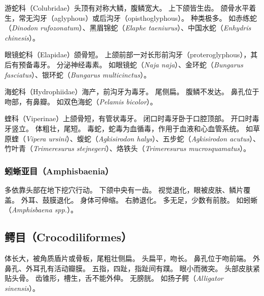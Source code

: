 \documentclass[11pt]{article}
\begin{document}
游蛇科（Colubridae）头顶有对称大鳞，腹鳞宽大。
上下颌皆生齿。
颌骨水平着生，常无沟牙（aglyphous）或后沟牙（opisthoglyphous）。
种类极多。
如赤练蛇（\textit{Dinodon rufozonatum}）、黑眉锦蛇（\textit{Elaphe taeniurus}）、中国水蛇（\textit{Enhydris chinesis}）。

\newline

眼镜蛇科（Elapidae）颌骨短。
上颌前部一对长形前沟牙（proteroglyphous），其后有预备毒牙。
分泌神经毒素。
如眼镜蛇（\textit{Naja naja}）、金环蛇（\textit{Bungarus fasciatus}）、银环蛇（\textit{Bungarus multicinctus}）。

\newline

海蛇科（Hydrophiidae）海产，前沟牙为毒牙。
尾侧扁。
腹鳞不发达。
鼻孔位于吻部，有鼻瓣。
如双色海蛇（\textit{Pelamis bicolor}）。

\newline

蝰科（Viperinae）上颌骨短，有管状毒牙。
闭口时毒牙卧于口腔顶部。
开口时毒牙竖立。
体粗壮，尾短。
毒蛇，蛇毒为血循毒，作用于血液和心血管系统。
如草原蝰（\textit{Vipera ursini}）、蝮蛇（\textit{Agkisirodon halys}）、五步蛇（\textit{Agkisirodon acutus}）、竹叶青（\textit{Trimeresurus stejnegeri}）、烙铁头（\textit{Trimeresurus mucrosquamatus}）。

\subsubsection{蚓蜥亚目（Amphisbaenia）}
多依靠头部在地下挖穴行动。
下颌中央有一齿。
视觉退化，眼被皮肤、鳞片覆盖。
外耳、鼓膜退化。
身体可伸缩。
右肺退化。
多无足，少数有前肢。
如蚓蜥（\textit{Amphisbaena spp.}）。

\subsection{鳄目（Crocodiliformes）}
体长大，被角质盾片或骨板，尾粗壮侧扁。
头扁平，吻长。
鼻孔位于吻前端。
外鼻孔、外耳孔有活动瓣膜。
五指，四趾，指趾间有蹼。
眼小而微突。
头部皮肤紧贴头骨。
齿锥形，槽生，舌不能外伸。
无膀胱。
如扬子鳄（\textit{Alligator sinensis}）。
\end{document}
